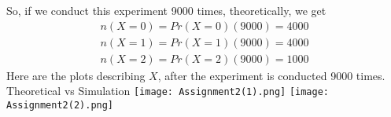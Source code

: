 \documentclass[journal,12pt,twocolumn]{IEEEtran}
\begin{document}
\newline
\newline
So, if we conduct this experiment 9000 times, theoretically, we get 
\begin{align}
    \tag{5.25.15}
    n(X=0)=Pr(X=0)(9000)=4000\\
    \tag{5.25.16}
    n(X=1)=Pr(X=1)(9000)=4000\\
    \tag{5.25.17}
    n(X=2)=Pr(X=2)(9000)=1000
\end{align}
\newpage
Here are the plots describing $X$, after the experiment is conducted 9000 times.
\newline
\newline
Theoretical vs Simulation
\newline
\newline
\texttt{[image: Assignment2(1).png]}
\texttt{[image: Assignment2(2).png]}
\end{document}
